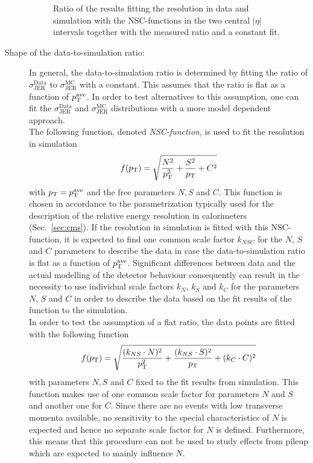\begin{description}
\begin{figure}[!p]
\begin{tabular}{cc}
  \end{tabular}
  \caption{Ratio of the results fitting the resolution in data and simulation with the NSC-functions in the two central $|\eta|$ intervals together with the measured ratio and a constant fit.}
  \label{fig:NSC_Fits_ratio}
\end{figure} 

\item[Shape of the data-to-simulation ratio:] In general, the data-to-simulation ratio is determined by fitting the ratio of $\sigma^\mathrm{Data}_\mathrm{JER}$ to $\sigma^\mathrm{MC}_\mathrm{JER}$ with a constant. This assumes that the ratio is flat as a function of $p_{\text{T}}^\mathrm{ave}$. In order to test alternatives to this assumption, one can fit the $\sigma^\mathrm{Data}_\mathrm{JER}$ and $\sigma^\mathrm{MC}_\mathrm{JER}$ distributions with a more model dependent approach. \\ 
The following function, denoted \textit{NSC-function}, is used to fit the resolution in simulation
\begin{equation}
f(p_{\text{T}}) = \sqrt{\frac{N^2}{p_{\text{T}}^{2}} + \frac{S^2}{p_{\text{T}}} + C^2}
\label{eq:NSC}
\end{equation}
with $p_{\text{T}}=p_{\text{T}}^\mathrm{ave}$ and the free parameters $N, S$ and $C$. This function is chosen in accordance to the parametrization typically used for the description of the relative energy resolution in calorimeters (\cf Sec.~\ref{sec:cms}). If the resolution in simulation is fitted with this NSC-function, it is expected to find one common scale factor $k_{NSC}$ for the $N$, $S$ and $C$ parameters to describe the data in case the data-to-simulation ratio is flat as a function of $p_{\text{T}}^\mathrm{ave}$. Significant differences between data and the actual modelling of the detector behaviour consequently can result in the necessity to use individual scale factors $k_N$, $k_S$ and $k_C$ for the parameters $N$, $S$ and $C$ in order to describe the data based on the fit results of the function to the simulation. \\
In order to test the assumption of a flat ratio, the data points are fitted with the following function 
\begin{equation}
f(p_{\text{T}}) = \sqrt{\frac{(k_{NS} \cdot N)^2}{p_{\text{T}}^{2}} + \frac{(k_{NS} \cdot S)^2}{p_{\text{T}}} + (k_{C} \cdot C)^2} 
\end{equation} 
with parameters $N, S$ and $C$ fixed to the fit results from simulation. This function makes use of one common scale factor for parameters $N$ and $S$ and another one for $C$. Since there are no events with low transverse momenta available, no sensitivity to the special characteristics of $N$ is expected and hence no separate scale factor for $N$ is defined. Furthermore, this means that this procedure can not be used to study effects from pileup which are expected to mainly influence $N$. \\

\end{description}

